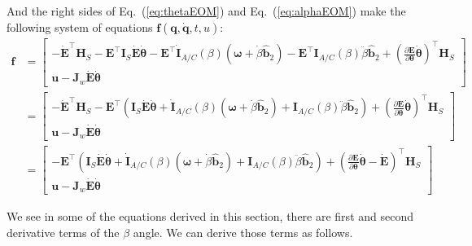 \documentclass[titlepage]{article}
\begin{document}
And the right sides of Eq.~(\ref{eq:thetaEOM}) and Eq.~(\ref{eq:alphaEOM}) make the following system of equations $\boldsymbol{f}(\boldsymbol{q},\dot{\boldsymbol{q}},t,u)$:
\begingroup
\footnotesize
\begin{equation}
	\begin{split}
		\boldsymbol{f}&=
		\begin{bmatrix}
			-\dot{\boldsymbol{E}}^\top\boldsymbol{H}_S-\boldsymbol{E}^\top\boldsymbol{I}_S\dot{\boldsymbol{E}}\dot{\boldsymbol{\theta}}-\boldsymbol{E}^\top\dot{\boldsymbol{I}}_{A/C}(\beta)\left(\boldsymbol{\omega}+\dot{\beta}\hat{\boldsymbol{b}}_2\right)-\boldsymbol{E}^\top\boldsymbol{I}_{A/C}(\beta)\ddot{\beta}\hat{\boldsymbol{b}}_2+\left(\frac{\partial\boldsymbol{E}}{\partial\boldsymbol{\theta}}\dot{\boldsymbol{\theta}}\right)^\top\boldsymbol{H}_S \\
			\boldsymbol{u}-\boldsymbol{J}_w\dot{\boldsymbol{E}}\dot{\boldsymbol{\theta}}
		\end{bmatrix} \\
		&=
		\begin{bmatrix}
			-\dot{\boldsymbol{E}}^\top\boldsymbol{H}_S-\boldsymbol{E}^\top\left(\boldsymbol{I}_S\dot{\boldsymbol{E}}\dot{\boldsymbol{\theta}}+\dot{\boldsymbol{I}}_{A/C}(\beta)\left(\boldsymbol{\omega}+\dot{\beta}\hat{\boldsymbol{b}}_2\right)+\boldsymbol{I}_{A/C}(\beta)\ddot{\beta}\hat{\boldsymbol{b}}_2\right)+\left(\frac{\partial\boldsymbol{E}}{\partial\boldsymbol{\theta}}\dot{\boldsymbol{\theta}}\right)^\top\boldsymbol{H}_S \\
			\boldsymbol{u}-\boldsymbol{J}_w\dot{\boldsymbol{E}}\dot{\boldsymbol{\theta}}
		\end{bmatrix} \\
		&=
		\begin{bmatrix}
			-\boldsymbol{E}^\top\left(\boldsymbol{I}_S\dot{\boldsymbol{E}}\dot{\boldsymbol{\theta}}+\dot{\boldsymbol{I}}_{A/C}(\beta)\left(\boldsymbol{\omega}+\dot{\beta}\hat{\boldsymbol{b}}_2\right)+\boldsymbol{I}_{A/C}(\beta)\ddot{\beta}\hat{\boldsymbol{b}}_2\right)+\left(\frac{\partial\boldsymbol{E}}{\partial\boldsymbol{\theta}}\dot{\boldsymbol{\theta}}-\dot{\boldsymbol{E}}\right)^\top\boldsymbol{H}_S \\
			\boldsymbol{u}-\boldsymbol{J}_w\dot{\boldsymbol{E}}\dot{\boldsymbol{\theta}}
		\end{bmatrix}
	\end{split}
	\label{eq:f}
\end{equation}
\endgroup

We see in some of the equations derived in this section, there are first and second derivative terms of the $\beta$ angle. We can derive those terms as follows.\\
\end{document}
